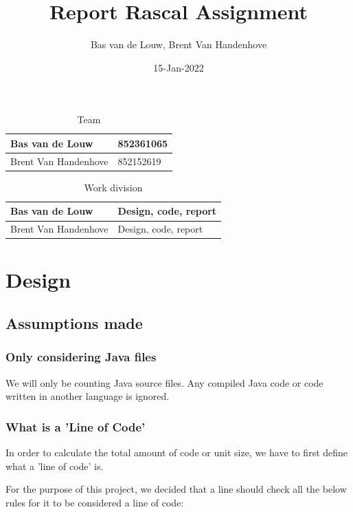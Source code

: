\documentclass{article}
\title{Report Rascal Assignment}
\author{Bas van de Louw, Brent Van Handenhove}
\date{15-Jan-2022}
\begin{document}
\maketitle

\begin{table}[h!tbp]
	\caption{Team}
	\begin{tabular}{l|l}
		\hline
		Bas van de Louw      & 852361065 \\
		\hline
		Brent Van Handenhove & 852152619 \\
		\hline
	\end{tabular}
\end{table}

\begin{table}[h!tbp]
	\caption{Work division}
	\begin{tabular}{l|l}
		\hline
		Bas van de Louw      & Design, code, report \\
		\hline
		Brent Van Handenhove & Design, code, report \\
		\hline
	\end{tabular}
\end{table}

\hrulefill{}

\vfill
\clearpage

\tableofcontents
\vfill
\clearpage

\section{Design}

\subsection{Assumptions made}

\subsubsection{Only considering Java files}
We will only be counting Java source files. Any compiled Java code or code written in another language is ignored.

\subsubsection{What is a 'Line of Code'} \label{defining loc}
In order to calculate the total amount of code or unit size, we have to first define what a 'line of code' is.

For the purpose of this project, we decided that a line should check all the below rules for it to be considered a line of code:
\end{document}
